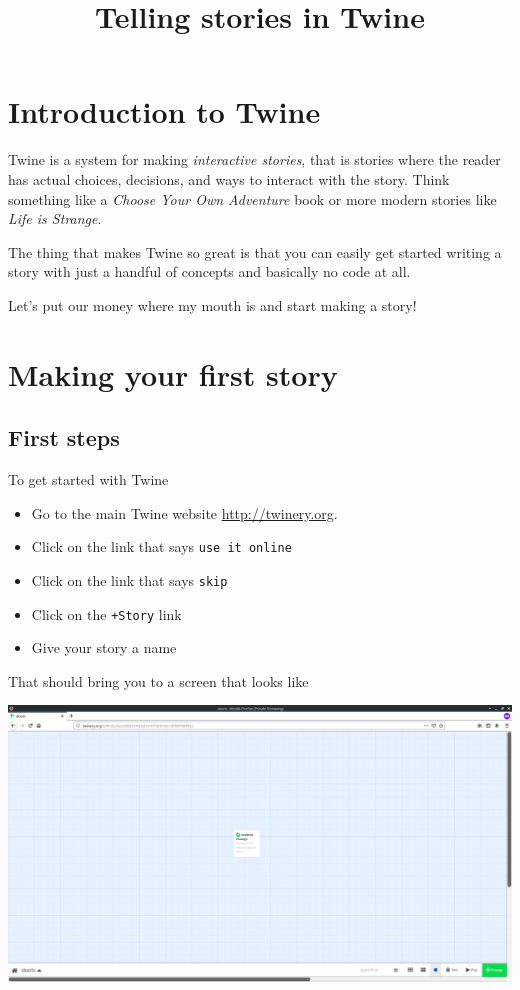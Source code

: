 \documentclass[a5paper,11pt]{article}
\title{Telling stories in Twine}
\date{}
\begin{document}
\maketitle

\newpage

\tableofcontents

\section{Introduction to Twine}
Twine is a system for making \emph{interactive stories}, that is stories where the reader has actual choices, decisions, and ways to interact with the story. Think something like a \emph{Choose Your Own Adventure} book or more modern stories like \emph{Life is Strange}.

The thing that makes Twine so great is that you can easily get started writing a story with just a handful of concepts and basically no code at all.

Let's put our money where my mouth is and start making a story!
\newpage
\section{Making your first story}
\subsection{First steps}
To get started with Twine

\begin{itemize}
 \item Go to the main Twine website \url{http://twinery.org}. 
 \item Click on the link that says \verb"use it online"
 \item Click on the link that says \verb"skip"
 \item Click on the \verb"+Story" link
 \item Give your story a name
\end{itemize}

That should bring you to a screen that looks like

\includegraphics[width=1.1\linewidth]{TwineHome}
\end{document}
